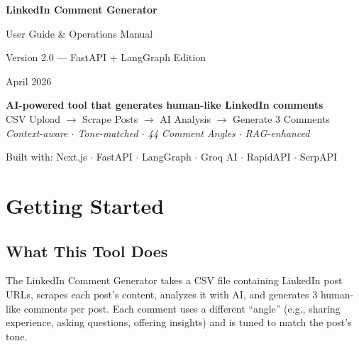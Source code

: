 \documentclass[12pt,a4paper]{article}
\begin{document}
\begin{titlepage}
\centering
\vspace*{2cm}
{\Huge\bfseries\color{primary} LinkedIn Comment Generator\par}
\vspace{0.5cm}
{\Large\color{darktext} User Guide \& Operations Manual\par}
\vspace{1cm}
{\large Version 2.0 --- FastAPI + LangGraph Edition\par}
\vspace{0.5cm}
{\large April 2026\par}
\vspace{2cm}

\begin{tcolorbox}[colback=bglight,colframe=primary,width=0.8\textwidth]
\centering
\textbf{AI-powered tool that generates human-like LinkedIn comments}\\[6pt]
CSV Upload $\rightarrow$ Scrape Posts $\rightarrow$ AI Analysis $\rightarrow$ Generate 3 Comments\\[6pt]
\textit{Context-aware $\cdot$ Tone-matched $\cdot$ 44 Comment Angles $\cdot$ RAG-enhanced}
\end{tcolorbox}

\vfill
{\small Built with: Next.js $\cdot$ FastAPI $\cdot$ LangGraph $\cdot$ Groq AI $\cdot$ RapidAPI $\cdot$ SerpAPI\par}
\end{titlepage}

\tableofcontents
\newpage

\section{Getting Started}

\subsection{What This Tool Does}
The LinkedIn Comment Generator takes a CSV file containing LinkedIn post URLs, scrapes each post's content, analyzes it with AI, and generates 3 human-like comments per post. Each comment uses a different ``angle'' (e.g., sharing experience, asking questions, offering insights) and is tuned to match the post's tone.
\end{document}
